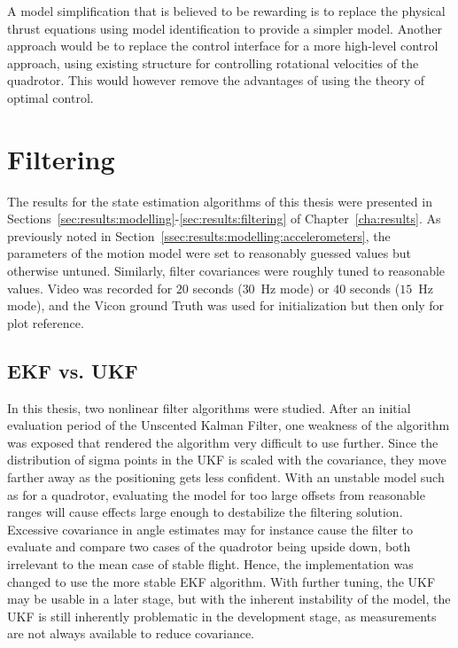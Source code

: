         A model simplification that is believed to be rewarding
        is to replace the physical thrust equations using model identification
        to provide a simpler model. Another approach would be to replace the
        control interface for a more high-level control approach, using
        existing structure for controlling rotational velocities of the
        quadrotor. This would however remove the advantages of using
        the theory of optimal control.

    \section{Filtering}
        The results for the state estimation algorithms of this thesis
        were presented in Sections~\ref{sec:results:modelling}-\ref{sec:results:filtering} of Chapter~\ref{cha:results}.
        As previously noted in Section~\ref{ssec:results:modelling:accelerometers},
        the parameters of the motion model were set to reasonably guessed values
        but otherwise untuned. Similarly, filter covariances were roughly
        tuned to reasonable values. Video was recorded for $20$ seconds ($30$~Hz mode)
        or $40$ seconds ($15$~Hz mode), and the Vicon ground Truth was used for
        initialization but then only for plot reference.

        \subsection{EKF vs. UKF}
            In this thesis, two nonlinear filter algorithms were studied.
            After an initial evaluation period of the Unscented Kalman Filter,
            one weakness of the algorithm was exposed that rendered the
            algorithm very difficult to use further.
            Since the distribution of sigma points in the UKF is scaled with
            the covariance, they move farther away as the positioning gets
            less confident.
            With an unstable model such as for a quadrotor,
            evaluating the model for too large offsets from reasonable ranges
            will cause effects large enough to destabilize the filtering solution.
            Excessive covariance in angle estimates may for instance
            cause the filter to evaluate and compare two cases of the quadrotor
            being upside down, both irrelevant to the mean case of stable flight.
            Hence, the implementation was changed to use the more stable EKF algorithm.
            With further tuning, the UKF may be usable in a later stage, but with the inherent
            instability of the model, the UKF is still inherently problematic in
            the development stage, as measurements are not always
            available to reduce covariance.

